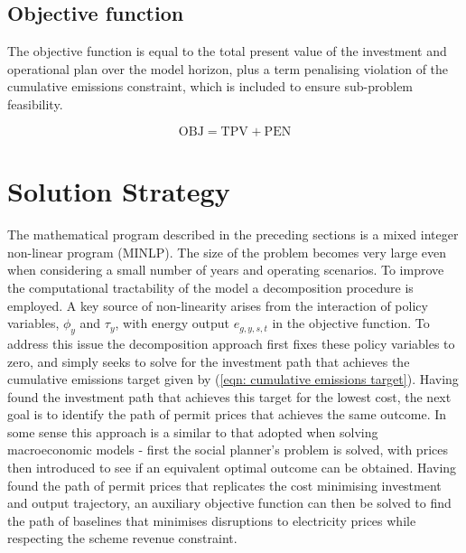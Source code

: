 \documentclass{article}
\newcommand{\iGenerator}{g}
\newcommand{\iYear}{y}
\newcommand{\iScenario}{s}
\newcommand{\iInterval}{t}
\newcommand{\cTotalPresentValue}[1][]{\mathrm{TPV}_{#1}}
\newcommand{\cEmissionsViolationTotalCost}{\mathrm{PEN}}
\newcommand{\cObjectiveFunction}{\mathrm{OBJ}}
\newcommand{\vBaseline}[1][\iYear]{\phi_{#1}}
\newcommand{\vPermitPrice}[1][\iYear]{\tau_{#1}}
\newcommand{\vEnergy}[1][\iGenerator,\iYear,\iScenario,\iInterval]{e_{#1}}
\begin{document}
\subsection{Objective function}
The objective function is equal to the total present value of the investment and operational plan over the model horizon, plus a term penalising violation of the cumulative emissions constraint, which is included to ensure sub-problem feasibility.


\begin{equation}
	\cObjectiveFunction = \cTotalPresentValue + \cEmissionsViolationTotalCost
\end{equation}


\section{Solution Strategy}
The mathematical program described in the preceding sections is a mixed integer non-linear program (MINLP). The size of the problem becomes very large even when considering a small number of years and operating scenarios. To improve the computational tractability of the model a decomposition procedure is employed. A key source of non-linearity arises from the interaction of policy variables, $\vBaseline$ and $\vPermitPrice$, with energy output $\vEnergy$ in the objective function. To address this issue the decomposition approach first fixes these policy variables to zero, and simply seeks to solve for the investment path that achieves the cumulative emissions target given by (\ref{eqn: cumulative emissions target}). Having found the investment path that achieves this target for the lowest cost, the next goal is to identify the path of permit prices that achieves the same outcome. In some sense this approach is a similar to that adopted when solving macroeconomic models - first the social planner's problem is solved, with prices then introduced to see if an equivalent optimal outcome can be obtained. Having found the path of permit prices that replicates the cost minimising investment and output trajectory, an auxiliary objective function can then be solved to find the path of baselines that minimises disruptions to electricity prices while respecting the scheme revenue constraint.
\end{document}
